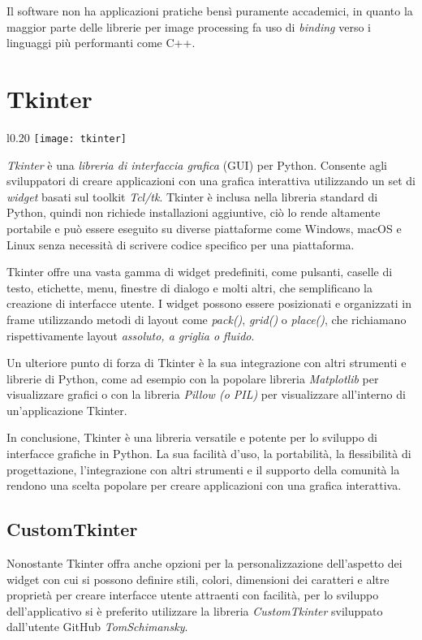 {Il software non ha applicazioni pratiche bensì puramente accademici, in quanto la maggior parte delle librerie per image processing fa uso di \textit{binding} verso i linguaggi più performanti come C++.

{\section{Tkinter}
	
	\begin{wrapfigure}{l}{0.20\textwidth}
		\centering
		\texttt{[image: tkinter]}
	\end{wrapfigure}
\textit{Tkinter} è una \textit{libreria di interfaccia grafica} (GUI) per Python. Consente agli sviluppatori di creare applicazioni con una grafica interattiva utilizzando un set di \textit{widget} basati sul toolkit \textit{Tcl/tk}. Tkinter è inclusa nella libreria standard di Python, quindi non richiede installazioni aggiuntive, ciò lo rende altamente portabile e può essere eseguito su diverse piattaforme come Windows, macOS e Linux senza necessità di scrivere codice specifico per una piattaforma.

Tkinter offre una vasta gamma di widget predefiniti, come pulsanti, caselle di testo, etichette, menu, finestre di dialogo e molti altri, che semplificano la creazione di interfacce utente. I widget possono essere posizionati e organizzati in frame utilizzando metodi di layout come \textit{pack()}, \textit{grid()} o \textit{place()}, che richiamano rispettivamente layout \textit{assoluto, a griglia o fluido}.

Un ulteriore punto di forza di Tkinter è la sua integrazione con altri strumenti e librerie di Python, come ad esempio con la popolare libreria \textit{Matplotlib} per visualizzare grafici o con la libreria \textit{Pillow (o PIL)} per visualizzare all'interno di un'applicazione Tkinter.

In conclusione, Tkinter è una libreria versatile e potente per lo sviluppo di interfacce grafiche in Python. La sua facilità d'uso, la portabilità, la flessibilità di progettazione, l'integrazione con altri strumenti e il supporto della comunità la rendono una scelta popolare per creare applicazioni con una grafica interattiva.
	
\subsection{CustomTkinter}
Nonostante Tkinter offra anche opzioni per la personalizzazione dell'aspetto dei widget con cui si possono definire stili, colori, dimensioni dei caratteri e altre proprietà per creare interfacce utente attraenti con facilità, per lo sviluppo dell'applicativo si è preferito utilizzare la libreria \textit{CustomTkinter} sviluppato dall'utente GitHub \textit{TomSchimansky}.

}}
